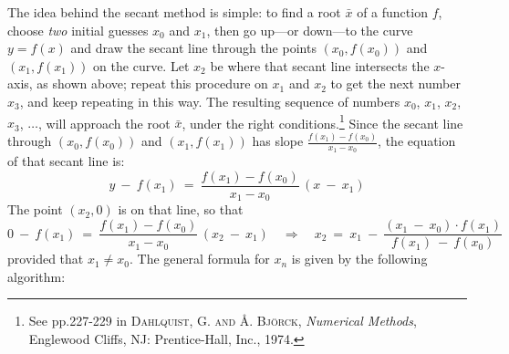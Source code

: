 \noindent The idea behind the secant method is simple: to find a root $\bar{x}$
of a function $f$, choose \emph{two} initial guesses $x_0$ and $x_1$, then go
up---or down---to the curve $y=f(x)$ and draw the secant line through the points
$(x_0,f(x_0))$ and $(x_1,f(x_1))$ on the curve. Let $x_2$ be where that secant
line intersects the $x$-axis, as shown above; repeat this procedure on $x_1$ and
$x_2$ to get the next number $x_3$, and keep repeating in this way. The
resulting sequence of numbers $x_0$, $x_1$, $x_2$, $x_3$, $\ldots$, will
approach the root $\bar{x}$, under the right conditions.\footnote{See pp.227-229
in \textsc{Dahlquist, G. and \AA. Bj\"orck}, \emph{Numerical Methods},
Englewood Cliffs, NJ: Prentice-Hall, Inc., 1974.}
\newpage
Since the secant line through $(x_0,f(x_0))$ and $(x_1,f(x_1))$ has slope
$\frac{f(x_1) - f(x_0)}{x_1 - x_0}$, the equation of that secant line is:
\[
y ~-~ f(x_1) ~=~ \frac{f(x_1) - f(x_0)}{x_1 - x_0}\,(x ~-~ x_1)
\]
The point $(x_2,0)$ is on that line, so that
\[
0 ~-~ f(x_1) ~=~ \frac{f(x_1) - f(x_0)}{x_1 - x_0}\,(x_2 ~-~ x_1)
\quad\Rightarrow\quad
x_2 ~=~ x_1 ~-~ \frac{(x_1 ~-~ x_0) \cdot f(x_1)}{f(x_1) ~-~ f(x_0)}
\]
provided that $x_1 \ne x_0$. The general formula for $x_n$ is given by the
following algorithm:


